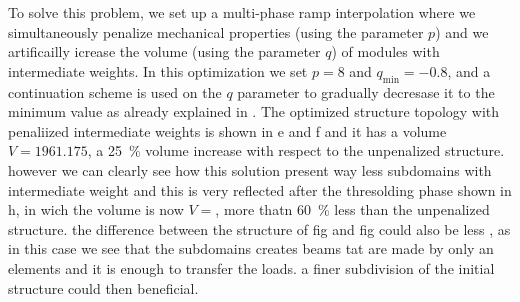 \begin{figure}
    \hfill
    \hfill
    \hfill
    \caption{}
    \label{fig:06_fixed_module}
\end{figure}

To solve this problem, we set up a multi-phase \gls{ramp} interpolation where we simultaneously penalize mechanical properties (using the parameter $p$) and we artificailly icrease the volume (using the parameter $q$) of modules with intermediate weights. In this optimization we set $p=8$ and $q_\text{min}=-0.8$, and a continuation scheme is used on the $q$ parameter to gradually decresase it to the minimum value as already explained in . The optimized structure topology with penaliized intermediate weights is shown in e and f and it has a volume $V = 1961.175$, a \qty{25}{\percent} volume increase with respect to the unpenalized structure. however we can clearly see how this solution present way less subdomains with intermediate weight and this is very reflected after the thresolding phase shown in h, in wich the volume is now $V=$, more thatn \qty{60}{\percent} less than the unpenalized structure. the difference between the structure of fig and fig could also be less , as in this case we see that the subdomains creates beams tat are made by only an elements and it is enough to transfer the loads. a finer subdivision of the initial structure could then beneficial.

